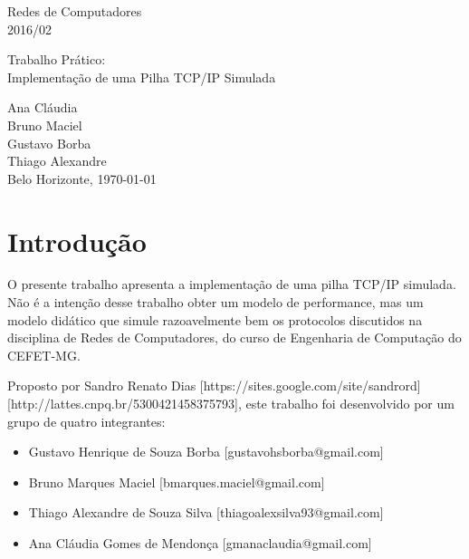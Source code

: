 \documentclass[11pt]{article}
\begin{document}
\thispagestyle{empty}

\begin{center}
\begin{minipage}[l]{10cm}{
\center
Redes de Computadores \\
2016/02 \\
}\end{minipage}
 \vfill
 \begin{minipage}[l]{11cm}{
   \begin{center}
   \Large{Trabalho Prático: \\ Implementação de uma Pilha TCP/IP Simulada}
   \end{center}
}\end{minipage}
\end{center}
 \vspace*{8cm}
 \begin{center}
 \begin{minipage}[l]{10cm}{
 \center Ana Cláudia \\Bruno Maciel\\ Gustavo Borba\\ Thiago Alexandre\\
 Belo Horizonte, \today \\
 }
 \end{minipage}
 \end{center}

\newpage
\thispagestyle{empty}
\tableofcontents

\newpage
\clearpage
\setcounter{page}{1}

\section{Introdução}

    O presente trabalho apresenta a implementação de uma pilha TCP/IP simulada. Não é a intenção desse trabalho obter um modelo de performance, mas um modelo didático que simule razoavelmente bem os protocolos discutidos na disciplina de Redes de Computadores, do curso de Engenharia de Computação do CEFET-MG. 
    
    Proposto por Sandro Renato Dias [https://sites.google.com/site/sandrord] [http://lattes.cnpq.br/5300421458375793], este trabalho foi desenvolvido por um grupo de quatro integrantes:
    
    \begin{itemize}
        \item Gustavo Henrique de Souza Borba [gustavohsborba@gmail.com]
        \item Bruno Marques Maciel [bmarques.maciel@gmail.com]
        \item Thiago Alexandre de Souza Silva [thiagoalexsilva93@gmail.com]
        \item Ana Cláudia Gomes de Mendonça [gmanaclaudia@gmail.com]
    \end{itemize}
    
\end{document}
